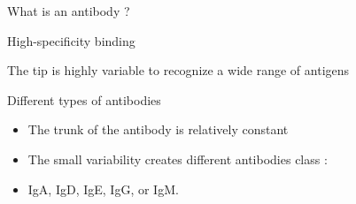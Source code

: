 \begin{frame}{What is an antibody ?}

    

    \begin{block}{High-specificity binding}
        
        The tip is highly variable to recognize a wide range of antigens
    \end{block}

    \begin{block}{Different types of antibodies}
        \begin{itemize}
        \item The trunk of the antibody is relatively constant 
        \item The small variability creates different antibodies class :\\
        \item[] IgA, IgD, IgE, IgG, or IgM.
        \end{itemize}

    \end{block}
    
\end{frame}